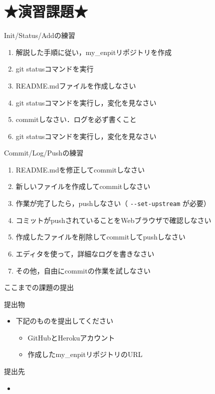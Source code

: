 \documentclass[t, aspectratio=169]{beamer}
\begin{document}
\section{★演習課題★}
\label{sec-2-4}
\begin{frame}[label=sec-2-4-1]{Init/Status/Addの練習}
\begin{enumerate}
\item 解説した手順に従い，my\_enpitリポジトリを作成
\item git statusコマンドを実行
\item README.mdファイルを作成しなさい
\item git statusコマンドを実行し，変化を見なさい
\item commitしなさい．ログを必ず書くこと
\item git statusコマンドを実行し，変化を見なさい
\end{enumerate}
\end{frame}
\begin{frame}[fragile,label=sec-2-4-2]{Commit/Log/Pushの練習}
 \begin{enumerate}
\item README.mdを修正してcommitしなさい
\item 新しいファイルを作成してcommitしなさい
\item 作業が完了したら，pushしなさい（ \texttt{-{}-set-upstream} が必要）
\item コミットがpushされていることをWebブラウザで確認しなさい
\item 作成したファイルを削除してcommitしてpushしなさい
\item エディタを使って，詳細なログを書きなさい
\item その他，自由にcommitの作業を試しなさい
\end{enumerate}
\end{frame}
\begin{frame}[label=sec-2-4-3]{ここまでの課題の提出}
\begin{block}{提出物}
\begin{itemize}
\item 下記のものを提出してください
\begin{itemize}
\item GitHubとHerokuアカウント
\item 作成したmy\_enpitリポジトリのURL
\end{itemize}
\end{itemize}
\end{block}
\begin{block}{提出先}
\begin{itemize}
\item\relax [\href{https://docs.google.com/forms/d/1SiKQqDLQw2YiJieYVS79ywpHIaNC3uI9cNPb_ddhC1Q/viewform?usp=send_form}{enPiT演習アカウント(2014)}]
\end{itemize}
\end{block}
\end{frame}
\end{document}

